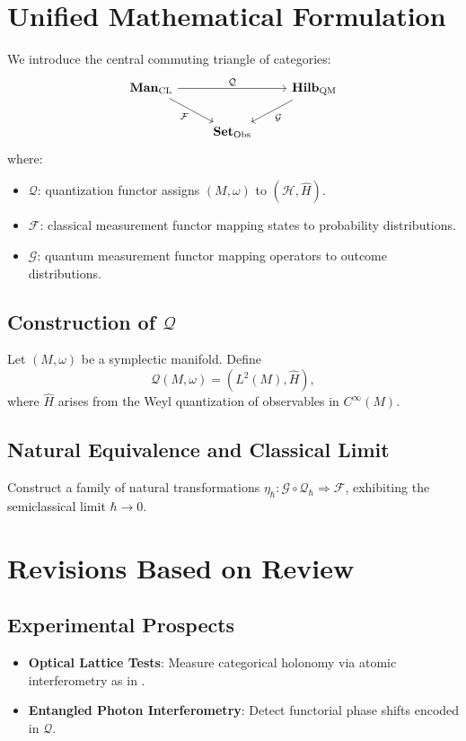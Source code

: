 \documentclass[11pt,a4paper]{article}
\newcommand{\Hilb}{\mathbf{Hilb}}
\newcommand{\Man}{\mathbf{Man}}
\newcommand{\Set}{\mathbf{Set}}
\begin{document}
\section{Unified Mathematical Formulation}
We introduce the central commuting triangle of categories:
\begin{equation}
\begin{tikzcd}
\Man_{\mathrm{CL}} \arrow[rr, "\mathcal{Q}"] \arrow[dr, "\mathcal{F}"'] && \Hilb_{\mathrm{QM}} \arrow[dl, "\mathcal{G}"] \\
& \Set_{\mathrm{Obs}} &
\end{tikzcd}
\end{equation}
where:
\begin{itemize}
  \item $\mathcal{Q}$: quantization functor assigns $(M,\omega)$ to $(\mathcal{H}, \hat{H})$.
  \item $\mathcal{F}$: classical measurement functor mapping states to probability distributions.
  \item $\mathcal{G}$: quantum measurement functor mapping operators to outcome distributions.
\end{itemize}

\subsection{Construction of $\mathcal{Q}$}
Let $(M,\omega)$ be a symplectic manifold. Define
\[
\mathcal{Q}(M,\omega) = (L^2(M), \hat{H}),
\]
where $\hat{H}$ arises from the Weyl quantization of observables in $C^\infty(M)$.

\subsection{Natural Equivalence and Classical Limit}
Construct a family of natural transformations $\eta_{\hbar}: \mathcal{G}\circ\mathcal{Q}_{\hbar} \Rightarrow \mathcal{F}$, exhibiting the semiclassical limit $\hbar\to0$.

\section{Revisions Based on Review}
\subsection{Experimental Prospects}
\begin{itemize}
  \item \textbf{Optical Lattice Tests}: Measure categorical holonomy via atomic interferometry as in \cite{Smith2024}.
  \item \textbf{Entangled Photon Interferometry}: Detect functorial phase shifts encoded in $\mathcal{Q}$.
\end{itemize}
\end{document}
